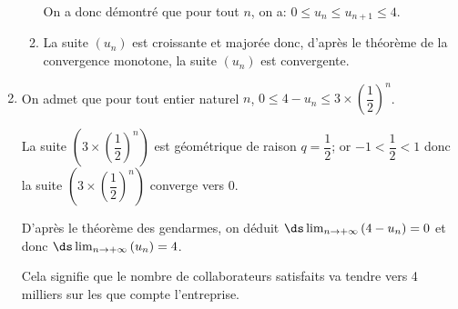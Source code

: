 \begin{enumerate}
\begin{enumerate}

On a donc démontré que pour tout $n$, on a: $0 \leqslant u_n \leqslant  u_{n+1}  \leqslant  4$.
		
		\item %

La suite $(u_n)$ est croissante et majorée donc, d'après le théorème de la convergence monotone, la suite $(u_n)$ est convergente.

	\end{enumerate}
	
\item On admet que pour tout entier naturel $n$,
$0  \leqslant 4 - u_n \leqslant 3 \times \left(\dfrac{1}{2}\right)^n$.

La suite $ \left (3 \times \left(\dfrac{1}{2}\right)^n\right )$ est géométrique de raison $q=\dfrac{1}{2}$; or $-1<\dfrac{1}{2}<1$ donc la suite $ \left (3 \times \left(\dfrac{1}{2}\right)^n\right )$ converge vers 0.

D'après le théorème des gendarmes, on déduit
$\ds\lim_{n \to +\infty} \left (4 - u_n \right )=0$
et donc $\ds\lim_{n \to +\infty} \left ( u_n \right )=4$.


Cela signifie que le nombre de collaborateurs satisfaits va tendre vers 4 milliers sur les  que compte l'entreprise.

\end{enumerate}

\bigskip

